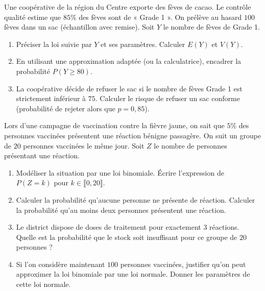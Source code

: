 \documentclass[11pt]{article}
\begin{document}
\begin{exercice}
Une coopérative de la région du Centre exporte des fèves de cacao. Le contrôle qualité estime que $85\%$ des fèves sont de « Grade 1 ». On prélève au hasard $100$ fèves dans un sac (échantillon avec remise). Soit $Y$ le nombre de fèves de Grade 1.
\begin{enumerate}
    \item Préciser la loi suivie par $Y$ et ses paramètres. Calculer $E(Y)$ et $V(Y)$.
    \item En utilisant une approximation adaptée (ou la calculatrice), encadrer la probabilité $P(Y \geq 80)$.
    \item La coopérative décide de refuser le sac si le nombre de fèves Grade 1 est strictement inférieur à $75$. Calculer le risque de refuser un sac conforme (probabilité de rejeter alors que $p=0,85$).
\end{enumerate}
\end{exercice}

\begin{exercice}
Lors d'une campagne de vaccination contre la fièvre jaune, on sait que $5\%$ des personnes vaccinées présentent une réaction bénigne passagère. On suit un groupe de $20$ personnes vaccinées le même jour. Soit $Z$ le nombre de personnes présentant une réaction.
\begin{enumerate}
    \item Modéliser la situation par une loi binomiale. Écrire l'expression de $P(Z = k)$ pour $k \in \llbracket 0, 20 \rrbracket$.
    \item Calculer la probabilité qu'aucune personne ne présente de réaction. Calculer la probabilité qu'au moins deux personnes présentent une réaction.
    \item Le district dispose de doses de traitement pour exactement $3$ réactions. Quelle est la probabilité que le stock soit insuffisant pour ce groupe de $20$ personnes ?
    \item Si l'on considère maintenant $100$ personnes vaccinées, justifier qu'on peut approximer la loi binomiale par une loi normale. Donner les paramètres de cette loi normale.
\end{enumerate}
\end{exercice}
\end{document}
